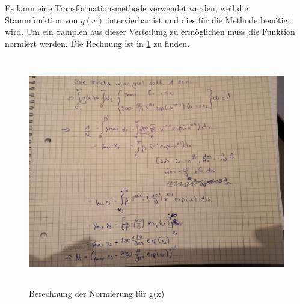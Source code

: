 Es kann eine Transformationsmethode
verwendet werden, weil die Stammfunktion von $g(x)$ intervierbar ist
und dies für die Methode benötigt wird.
Um ein Samplen aus dieser Verteilung zu ermöglichen muss die Funktion normiert werden.
Die Rechnung ist in \ref{fig:Rech} zu finden.
\begin{figure}
  \centering
  \includegraphics[height = 10cm]{pics/Rechnung2b.jpeg}
  \caption{Berechnung der Normierung für g(x)}
  \label{fig:Rech}
\end{figure}
